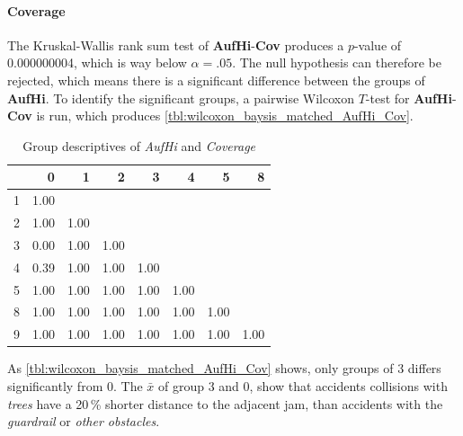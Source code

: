 \paragraph{Coverage}
The Kruskal-Wallis rank sum test of \textbf{AufHi}-\textbf{Cov} produces a $p$-value of 0.000000004, which is way below $\alpha=.05$. The null hypothesis can therefore be rejected, which means there is a significant difference between the groups of \textbf{AufHi}. To identify the significant groups, a pairwise Wilcoxon $T$-test for \textbf{AufHi}-\textbf{Cov} is run, which produces \autoref{tbl:wilcoxon_baysis_matched_AufHi_Cov}. 
\begin{table}[ht]
	\small
	\centering
    \begin{tabular}{rrrrrrrr}
        \toprule
        & 0 & 1 & 2 & 3 & 4 & 5 & 8 \\ 
        \midrule
        1 & 1.00 &  &  &  &  &  &  \\ 
        2 & 1.00 & 1.00 &  &  &  &  &  \\ 
        3 & 0.00 & 1.00 & 1.00 &  &  &  &  \\ 
        4 & 0.39 & 1.00 & 1.00 & 1.00 &  &  &  \\ 
        5 & 1.00 & 1.00 & 1.00 & 1.00 & 1.00 &  &  \\ 
        8 & 1.00 & 1.00 & 1.00 & 1.00 & 1.00 & 1.00 &  \\ 
        9 & 1.00 & 1.00 & 1.00 & 1.00 & 1.00 & 1.00 & 1.00 \\ 
        \bottomrule
      \end{tabular}
	\caption{Group descriptives of \textit{AufHi} and \textit{Coverage}}
	\label{tbl:wilcoxon_baysis_matched_AufHi_Cov}
\end{table}
As \autoref{tbl:wilcoxon_baysis_matched_AufHi_Cov} shows, only groups of 3 differs significantly from 0. The $\bar{x}$ of group 3 and 0, show that accidents collisions with \textit{trees} have a 20\,\% shorter distance to the adjacent jam, than accidents with the \textit{guardrail} or \textit{other obstacles}.
